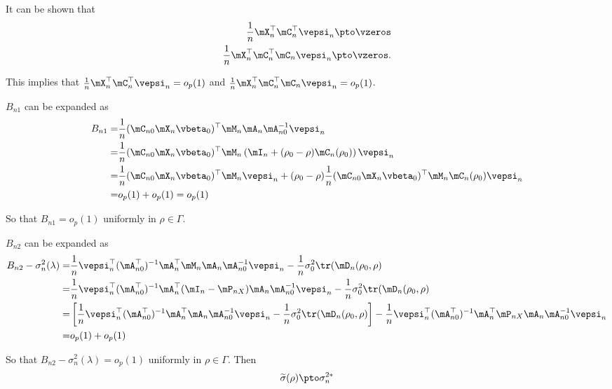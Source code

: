 \documentclass[english,12pt]{book}\usepackage[]{graphicx}\usepackage[]{xcolor}
\begin{document}
\begin{subappendices}
It can be shown that 
\begin{equation}
    \begin{aligned}
      \frac{1}{n}\mX_n^\top\mC_n^\top\vepsi_n \pto \vzeros \\
      \frac{1}{n}\mX_n^\top\mC_n^\top\mC_n\vepsi_n \pto \vzeros. 
    \end{aligned}
\end{equation}

This implies that $\frac{1}{n}\mX_n^\top\mC_n^\top\vepsi_n  =o_p(1)$ and $\frac{1}{n}\mX_n^\top\mC_n^\top\mC_n\vepsi_n = o_p(1)$.

$B_{n1}$ can be expanded as
\begin{equation*}
\begin{aligned}
B_{n1}  = &  \frac{1}{n}(\mC_{n0}\mX_n\vbeta_0)^\top\mM_n\mA_n\mA_{n0}^{-1}\vepsi_n \\
        = & \frac{1}{n}(\mC_{n0}\mX_n\vbeta_0)^\top\mM_n\left(\mI_n + (\rho_0 - \rho)\mC_n (\rho_0)\right)\vepsi_n \\
        = & \frac{1}{n}(\mC_{n0}\mX_n\vbeta_0)^\top\mM_n\vepsi_n + (\rho_0 - \rho)\frac{1}{n}(\mC_{n0}\mX_n\vbeta_0)^\top\mM_n\mC_n(\rho_0)\vepsi_n \\
        = & o_p(1) + o_p(1) = o_p(1)
\end{aligned} 
\end{equation*}

So that $B_{n1} = o_p(1)$ uniformly in $\rho \in \Gamma$.

$B_{n2}$ can be expanded as
\begin{equation*}
\begin{aligned}
B_{n2} - \sigma^2_n(\lambda) = & \frac{1}{n}\vepsi_n^\top(\mA_{n0}^\top)^{-1}\mA_n^\top\mM_n\mA_n\mA_{n0}^{-1}\vepsi_n -  \frac{1}{n}\sigma_0^2\tr(\mD_n(\rho_0, \rho)\\
= & \frac{1}{n}\vepsi_n^\top(\mA_{n0}^\top)^{-1}\mA_n^\top(\mI_n - \mP_{nX})\mA_n\mA_{n0}^{-1}\vepsi_n -  \frac{1}{n}\sigma_0^2\tr(\mD_n(\rho_0, \rho) \\
= & \left[\frac{1}{n}\vepsi_n^\top(\mA_{n0}^\top)^{-1}\mA_n^\top\mA_n\mA_{n0}^{-1}\vepsi_n -   \frac{1}{n}\sigma_0^2\tr(\mD_n(\rho_0, \rho)\right] - \frac{1}{n}\vepsi_n^\top(\mA_{n0}^\top)^{-1}\mA_n^\top\mP_{nX}\mA_n\mA_{n0}^{-1}\vepsi_n  \\
= & o_p(1) + o_p(1)
\end{aligned}
\end{equation*}

So that $B_{n2}  - \sigma^2_n(\lambda) = o_p(1)$ uniformly in $\rho \in \Gamma$. Then 
\begin{equation*}
\widetilde{\sigma}(\rho)  \pto \sigma^{2*}_n
\end{equation*}


\end{subappendices}
\end{document}
